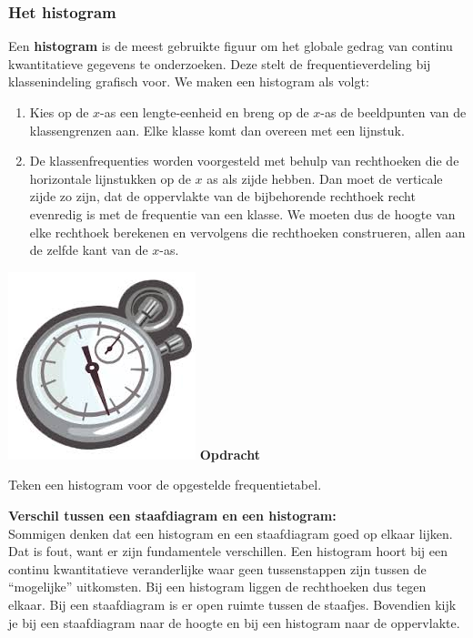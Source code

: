 \documentclass[12pt,twoside]{article}
\newcounter{nstopdracht}
\newenvironment{stopdracht}
{
  \stepcounter{nstopdracht}
  \vspace*{-0.25cm}
  \begin{minipage}{\textwidth}
  {%
  \hspace*{-0.85\marginparwidth}\includegraphics[width=0.75\marginparwidth]{stopwatch}
  \large\bf Opdracht \arabic{nstopdracht}}
}{%
  \end{minipage}
}
\begin{document}
\subsubsection{Het histogram}

Een {\bf histogram} is de meest gebruikte figuur om het globale gedrag van continu
kwantitatieve gegevens te onderzoeken. Deze stelt de frequentieverdeling bij klassenindeling
grafisch voor. We maken een histogram als volgt:

\begin{enumerate}
  \item Kies op de $x$-as een lengte-eenheid en breng op de $x$-as de beeldpunten van de klassengrenzen aan. Elke klasse komt dan overeen met een lijnstuk.
  \item De klassenfrequenties worden voorgesteld met behulp van rechthoeken die de horizontale lijnstukken op de $x$ as als zijde hebben. Dan moet de verticale zijde zo zijn, dat de oppervlakte van de bijbehorende rechthoek recht evenredig is met de frequentie van een klasse. We moeten dus de hoogte van elke rechthoek berekenen en vervolgens die rechthoeken construeren, allen aan de zelfde kant van de $x$-as.
\end{enumerate}

\begin{stopdracht}
Teken een histogram voor de opgestelde frequentietabel.
\begin{center}
\end{center}
\end{stopdracht}

{\bf Verschil tussen een staafdiagram en een histogram:}\\
Sommigen denken dat een histogram en een staafdiagram goed op elkaar
lijken. Dat is fout, want er zijn fundamentele verschillen. Een histogram hoort
bij een continu kwantitatieve veranderlijke waar geen tussenstappen zijn tussen
de “mogelijke” uitkomsten. Bij een histogram liggen de rechthoeken dus tegen
elkaar. Bij een staafdiagram is er open ruimte tussen de staafjes. Bovendien
kijk je bij een staafdiagram naar de hoogte en bij een histogram naar de
oppervlakte.
\end{document}
